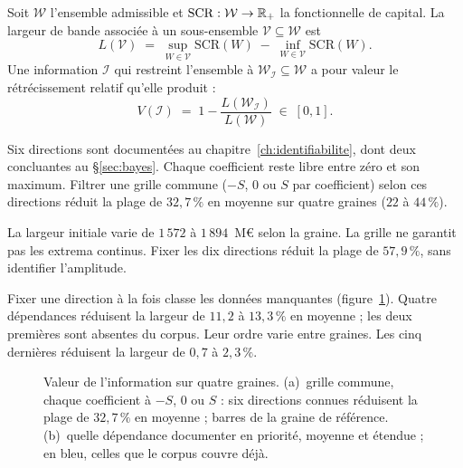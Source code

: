 \begin{definition}\label{def:voi}
Soit $\mathcal{W}$ l'ensemble admissible et $\mathrm{SCR}:\mathcal{W}\to\mathbb{R}_+$ la fonctionnelle de
capital. La largeur de bande associée à un sous-ensemble $\mathcal{V}\subseteq\mathcal{W}$ est
\begin{equation}
  L(\mathcal{V}) \;=\; \sup_{W\in\mathcal{V}}\mathrm{SCR}(W)\;-\;\inf_{W\in\mathcal{V}}\mathrm{SCR}(W).
  \label{eq:largeur-bande}
\end{equation}
Une information $\mathcal{I}$ qui restreint l'ensemble à $\mathcal{W}_{\mathcal{I}}\subseteq
\mathcal{W}$ a pour valeur le rétrécissement relatif qu'elle produit :
\begin{equation}
  V(\mathcal{I}) \;=\; 1-\frac{L(\mathcal{W}_{\mathcal{I}})}{L(\mathcal{W})} \;\in\;[0,1].
  \label{eq:voi}
\end{equation}
\end{definition}

Six directions sont documentées au chapitre~\ref{ch:identifiabilite}, dont deux concluantes au \S\ref{sec:bayes}.
Chaque coefficient reste libre entre zéro et son maximum. Filtrer une grille commune ($-S$, $0$ ou $S$ par coefficient)
selon ces directions réduit la plage de $32{,}7\,\%$ en moyenne sur quatre graines ($22$ à $44\,\%$).

La largeur initiale varie de $1\,572$ à $1\,894$~M\euro{} selon la graine. La grille ne garantit pas les extrema continus.
Fixer les dix directions réduit la plage de $57{,}9\,\%$, sans identifier l'amplitude.

Fixer une direction à la fois classe les données manquantes (figure~\ref{fig:voi}).
Quatre dépendances réduisent la largeur de $11{,}2$ à $13{,}3\,\%$ en moyenne ; les deux premières sont absentes du corpus.
Leur ordre varie entre graines. Les cinq dernières réduisent la largeur de $0{,}7$ à $2{,}3\,\%$.

\begin{figure}[H]
  \centering
  \caption{Valeur de l'information sur quatre graines. (a)~grille commune, chaque coefficient à $-S$, $0$ ou $S$ : six directions connues réduisent la plage de $32{,}7\,\%$ en moyenne ; barres de la graine de référence. (b)~quelle dépendance documenter en
priorité, moyenne et étendue ; en bleu, celles que le corpus couvre déjà.}
  \label{fig:voi}
\end{figure}
